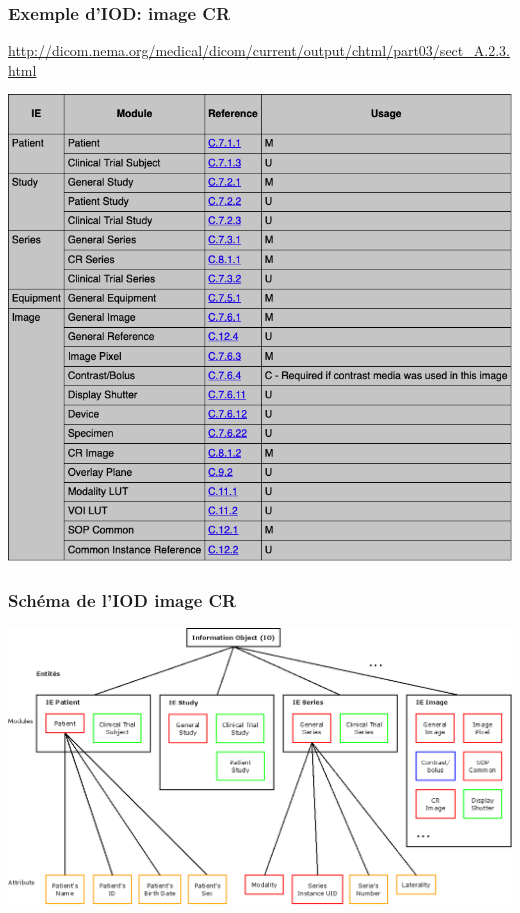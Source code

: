 	\frame
	{
		\frametitle{Exemple d'IOD: image CR}
		\url{http://dicom.nema.org/medical/dicom/current/output/chtml/part03/sect_A.2.3.html}
		\begin{center}
			\includegraphics[width=0.6\linewidth]{../figures/IOD-exemple-CR.png}
		\end{center}
	}

	\frame
	{
		\frametitle{Sch\'ema de l'IOD image CR}
		\begin{center}
			\includegraphics[width=\linewidth]{../figures/IO-definition.png}
		\end{center}
	}
	
